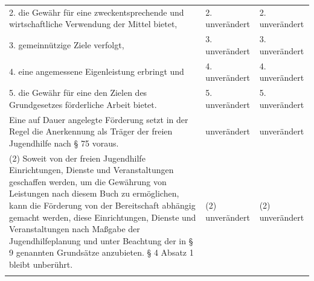 \documentclass[10pt,a4paper,landscape]{article}
\begin{document}
\begin{longtable}{|L{8.2cm}|L{8.2cm}|L{8.2cm}|}
\hhline{|---|}
2.  \newline die Gewähr für eine zweckentsprechende  \newline und wirtschaftliche Verwendung der Mittel  \newline bietet, & 2. unverändert & 2. unverändert \\
\hhline{|---|}
3.  \newline gemeinnützige Ziele verfolgt, & 3. unverändert & 3. unverändert \\
\hhline{|---|}
4.  \newline eine angemessene Eigenleistung erbringt  \newline und & 4. unverändert & 4. unverändert \\
\hhline{|---|}
5.  \newline die Gewähr für eine den Zielen des  \newline Grundgesetzes förderliche Arbeit bietet. & 5. unverändert & 5. unverändert \\
\hhline{|---|}
Eine auf Dauer angelegte Förderung setzt  \newline in der Regel die Anerkennung als Träger  \newline der freien Jugendhilfe nach \S{} 75 voraus. & unverändert & unverändert \\
\hhline{|---|}
(2) Soweit von der freien Jugendhilfe  \newline Einrichtungen, Dienste und  \newline Veranstaltungen geschaffen werden, um  \newline die Gewährung von Leistungen nach  \newline diesem Buch zu ermöglichen, kann die  \newline Förderung von der Bereitschaft abhängig  \newline gemacht werden, diese Einrichtungen,  \newline Dienste und Veranstaltungen nach  \newline Maßgabe der Jugendhilfeplanung und  \newline unter Beachtung der in \S{} 9 genannten  \newline Grundsätze anzubieten. \S{} 4 Absatz 1 bleibt  \newline unberührt. & (2) unverändert & (2) unverändert \\
\hhline{|---|}

\end{longtable}
\end{document}
